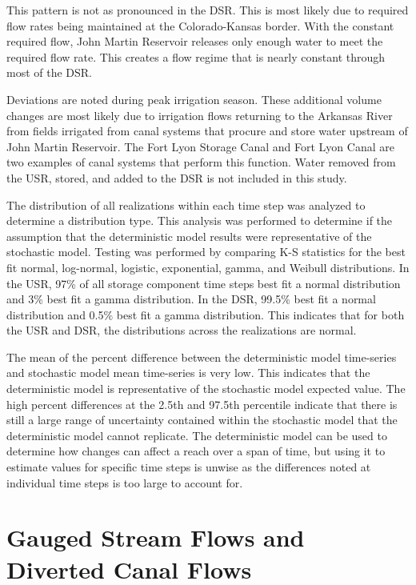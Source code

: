 \begin{linenumbers}
This pattern is not as pronounced in the DSR.  This is most likely due to required flow rates being maintained at the Colorado-Kansas border.  With the constant required flow, John Martin Reservoir releases only enough water to meet the required flow rate.  This creates a flow regime that is nearly constant through most of the DSR. 

Deviations are noted during peak irrigation season.  These additional volume changes are most likely due to irrigation flows returning to the Arkansas River from fields irrigated from canal systems that procure and store water upstream of John Martin Reservoir.  The Fort Lyon Storage Canal and Fort Lyon Canal are two examples of canal systems that perform this function.  Water removed from the USR, stored, and added to the DSR is not included in this study.

The distribution of all realizations within each time step was analyzed to determine a distribution type.  This analysis was performed to determine if the assumption that the deterministic model results were representative of the stochastic model.   Testing was performed by comparing K-S statistics for the best fit normal, log-normal, logistic, exponential, gamma, and Weibull distributions.  In the USR, 97\% of all storage component time steps best fit a normal distribution and 3\% best fit a gamma distribution.  In the DSR, 99.5\% best fit a normal distribution and 0.5\% best fit a gamma distribution.  This indicates that for both the USR and DSR, the distributions across the realizations are normal.

The mean of the percent difference between the deterministic model time-series and stochastic model mean time-series is very low.  This indicates that the deterministic model is representative of the stochastic model expected value.  The high percent differences at the 2.5th and 97.5th percentile indicate that there is still a large range of uncertainty contained within the stochastic model that the deterministic model cannot replicate.  The deterministic model can be used to determine how changes can affect a reach over a span of time, but using it to estimate values for specific time steps is unwise as the differences noted at individual time steps is too large to account for.
\clearpage

\section{Gauged Stream Flows and Diverted Canal Flows}
\label{sec:StreamFlows}


\end{linenumbers}
